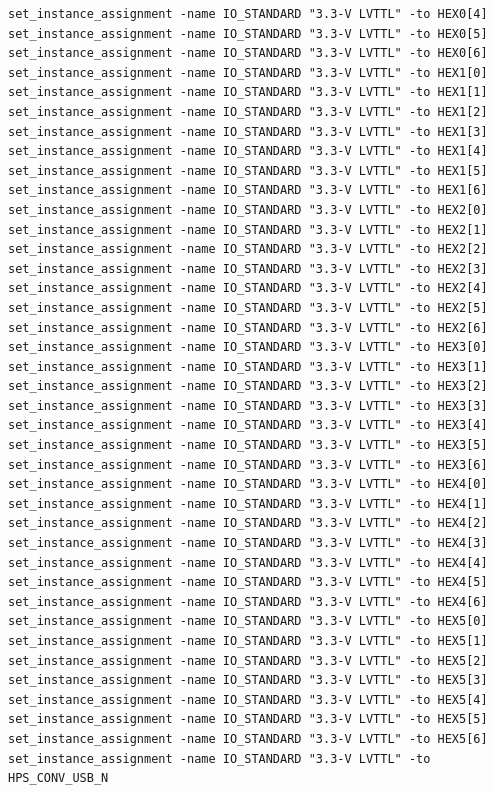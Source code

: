 \documentclass[conference]{IEEEtran}
\begin{document}
\begin{lstlisting}
set_instance_assignment -name IO_STANDARD "3.3-V LVTTL" -to HEX0[4]
set_instance_assignment -name IO_STANDARD "3.3-V LVTTL" -to HEX0[5]
set_instance_assignment -name IO_STANDARD "3.3-V LVTTL" -to HEX0[6]
set_instance_assignment -name IO_STANDARD "3.3-V LVTTL" -to HEX1[0]
set_instance_assignment -name IO_STANDARD "3.3-V LVTTL" -to HEX1[1]
set_instance_assignment -name IO_STANDARD "3.3-V LVTTL" -to HEX1[2]
set_instance_assignment -name IO_STANDARD "3.3-V LVTTL" -to HEX1[3]
set_instance_assignment -name IO_STANDARD "3.3-V LVTTL" -to HEX1[4]
set_instance_assignment -name IO_STANDARD "3.3-V LVTTL" -to HEX1[5]
set_instance_assignment -name IO_STANDARD "3.3-V LVTTL" -to HEX1[6]
set_instance_assignment -name IO_STANDARD "3.3-V LVTTL" -to HEX2[0]
set_instance_assignment -name IO_STANDARD "3.3-V LVTTL" -to HEX2[1]
set_instance_assignment -name IO_STANDARD "3.3-V LVTTL" -to HEX2[2]
set_instance_assignment -name IO_STANDARD "3.3-V LVTTL" -to HEX2[3]
set_instance_assignment -name IO_STANDARD "3.3-V LVTTL" -to HEX2[4]
set_instance_assignment -name IO_STANDARD "3.3-V LVTTL" -to HEX2[5]
set_instance_assignment -name IO_STANDARD "3.3-V LVTTL" -to HEX2[6]
set_instance_assignment -name IO_STANDARD "3.3-V LVTTL" -to HEX3[0]
set_instance_assignment -name IO_STANDARD "3.3-V LVTTL" -to HEX3[1]
set_instance_assignment -name IO_STANDARD "3.3-V LVTTL" -to HEX3[2]
set_instance_assignment -name IO_STANDARD "3.3-V LVTTL" -to HEX3[3]
set_instance_assignment -name IO_STANDARD "3.3-V LVTTL" -to HEX3[4]
set_instance_assignment -name IO_STANDARD "3.3-V LVTTL" -to HEX3[5]
set_instance_assignment -name IO_STANDARD "3.3-V LVTTL" -to HEX3[6]
set_instance_assignment -name IO_STANDARD "3.3-V LVTTL" -to HEX4[0]
set_instance_assignment -name IO_STANDARD "3.3-V LVTTL" -to HEX4[1]
set_instance_assignment -name IO_STANDARD "3.3-V LVTTL" -to HEX4[2]
set_instance_assignment -name IO_STANDARD "3.3-V LVTTL" -to HEX4[3]
set_instance_assignment -name IO_STANDARD "3.3-V LVTTL" -to HEX4[4]
set_instance_assignment -name IO_STANDARD "3.3-V LVTTL" -to HEX4[5]
set_instance_assignment -name IO_STANDARD "3.3-V LVTTL" -to HEX4[6]
set_instance_assignment -name IO_STANDARD "3.3-V LVTTL" -to HEX5[0]
set_instance_assignment -name IO_STANDARD "3.3-V LVTTL" -to HEX5[1]
set_instance_assignment -name IO_STANDARD "3.3-V LVTTL" -to HEX5[2]
set_instance_assignment -name IO_STANDARD "3.3-V LVTTL" -to HEX5[3]
set_instance_assignment -name IO_STANDARD "3.3-V LVTTL" -to HEX5[4]
set_instance_assignment -name IO_STANDARD "3.3-V LVTTL" -to HEX5[5]
set_instance_assignment -name IO_STANDARD "3.3-V LVTTL" -to HEX5[6]
set_instance_assignment -name IO_STANDARD "3.3-V LVTTL" -to HPS_CONV_USB_N

\end{lstlisting}
\end{document}
